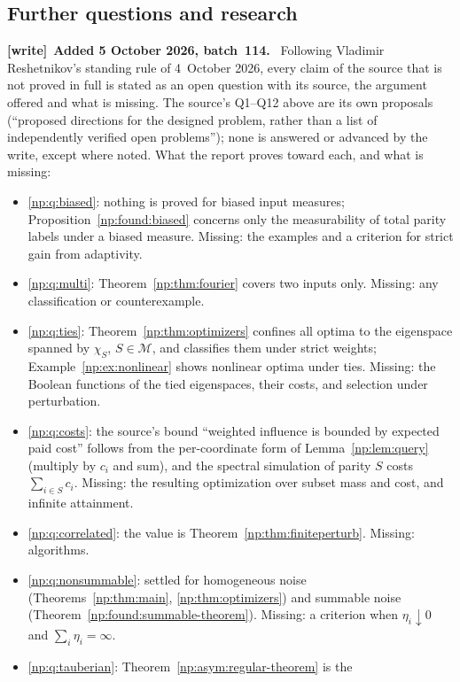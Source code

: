 \documentclass[11pt,a4paper]{article}
\theoremstyle{definition}
\theoremstyle{remark}
\newenvironment{writenote}[1][]{\par\smallskip\begingroup\small
 \noindent\textbf{[write]}\if\relax\detokenize{#1}\relax\else~\textbf{#1.}\fi\ }%
 {\par\endgroup\smallskip}
\begin{document}
\subsection{Further questions and research}\label{np:sec:further}
\begin{writenote}[Added 5 October 2026, batch~114]
Following Vladimir Reshetnikov's standing rule of 4~October 2026, every
claim of the source that is not proved in full is stated as an open
question with its source, the argument offered and what is missing. The
source's Q1--Q12 above are its own proposals (``proposed directions for the
designed problem, rather than a list of independently verified open
problems''); none is answered or advanced by the write, except where noted.
What the report proves toward each, and what is missing:
\begin{itemize}
\item \ref{np:q:biased}: nothing is proved for biased input measures;
 Proposition~\ref{np:found:biased} concerns only the measurability of
 total parity labels under a biased measure. Missing: the examples and a
 criterion for strict gain from adaptivity.
\item \ref{np:q:multi}: Theorem~\ref{np:thm:fourier} covers two inputs
 only. Missing: any classification or counterexample.
\item \ref{np:q:ties}: Theorem~\ref{np:thm:optimizers} confines all
 optima to the eigenspace spanned by $\chi_S$, $S\in\mathcal M$, and
 classifies them under strict weights; Example~\ref{np:ex:nonlinear}
 shows nonlinear optima under ties. Missing: the Boolean functions of the
 tied eigenspaces, their costs, and selection under perturbation.
\item \ref{np:q:costs}: the source's bound ``weighted influence is
 bounded by expected paid cost'' follows from the per-coordinate form of
 Lemma~\ref{np:lem:query} (multiply by $c_i$ and sum), and the spectral
 simulation of parity $S$ costs $\sum_{i\in S}c_i$. Missing: the
 resulting optimization over subset mass and cost, and infinite
 attainment.
\item \ref{np:q:correlated}: the value is
 Theorem~\ref{np:thm:finiteperturb}. Missing: algorithms.
\item \ref{np:q:nonsummable}: settled for homogeneous noise
 (Theorems~\ref{np:thm:main}, \ref{np:thm:optimizers}) and summable noise
 (Theorem~\ref{np:found:summable-theorem}). Missing: a criterion when
 $\eta_i\downarrow0$ and $\sum_i\eta_i=\infty$.
\item \ref{np:q:tauberian}: Theorem~\ref{np:asym:regular-theorem} is the

\end{itemize}
\end{writenote}
\end{document}
